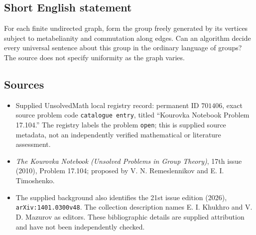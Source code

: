 \documentclass[11pt]{article}
\begin{document}
\subsection{Short English statement}
For each finite undirected graph, form the group freely generated by its vertices subject to metabelianity and commutation along edges. Can an algorithm decide every universal sentence about this group in the ordinary language of groups? The source does not specify uniformity as the graph varies.
\subsection{Sources}
\begin{itemize}
\item Supplied UnsolvedMath local registry record: permanent ID \(701406\), exact source problem code \texttt{catalogue entry}, titled ``Kourovka Notebook Problem 17.104.'' The registry labels the problem \texttt{open}; this is supplied source metadata, not an independently verified mathematical or literature assessment.
\item \emph{The Kourovka Notebook (Unsolved Problems in Group Theory)}, 17th issue (2010), Problem 17.104; proposed by V. N. Remeslennikov and E. I. Timoshenko.
\item The supplied background also identifies the 21st issue edition (2026), \texttt{arXiv:1401.0300v48}. The collection description names E. I. Khukhro and V. D. Mazurov as editors. These bibliographic details are supplied attribution and have not been independently checked.
\end{itemize}
\end{document}
